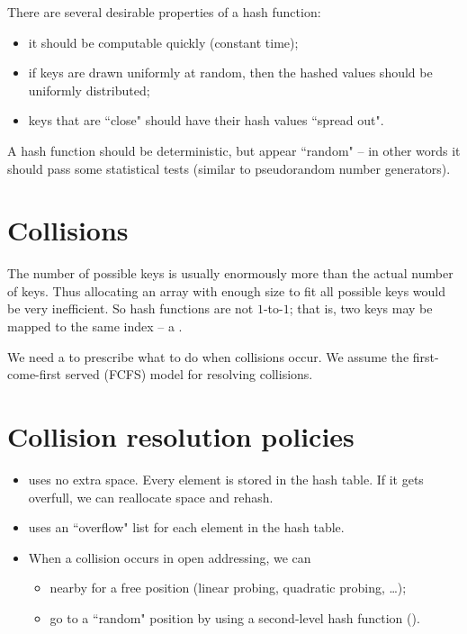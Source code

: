 There are several desirable properties of a hash function:
\begin{itemize}
\item it should be computable quickly (constant time);
\item if keys are drawn uniformly at random, then the hashed values
should be uniformly distributed;
\item keys that are ``close" should have their hash values ``spread out". 
\end{itemize}
A hash function should be deterministic, but appear ``random" -- in other 
words it should pass some statistical tests (similar to pseudorandom number generators). 

\section{Collisions}
The number of possible keys is usually enormously more than the actual number of keys. 
Thus allocating an array with enough size to fit all possible keys would be very inefficient. 
So hash functions are not $1$-to-$1$; that is, two keys may be mapped to the same index -- a . 

We need a  to prescribe what to do when collisions occur. 
We assume the first-come-first served (FCFS) model for resolving collisions.

\section{Collision resolution policies}
\begin{itemize}
\item {} uses no extra space. Every element is stored in the hash table. 
If it gets overfull, we can reallocate space and rehash.
\item {} uses an ``overflow" list for each element in the hash table.
\item When a collision occurs in open addressing, we can 
	\begin{itemize}
		\item {} nearby for a free position (linear probing, quadratic probing, \ldots);
		\item go to a ``random" position by using a second-level hash function 
		().
	\end{itemize}
\end{itemize}

